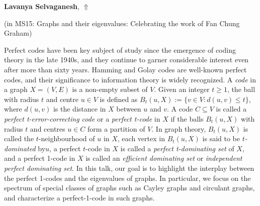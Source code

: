 \documentclass[ILAS2025-program.tex]{subfiles}
\begin{document}
\hypertarget{down0030}{}\begin{ilasabstract}
    
\textbf{Lavanya Selvaganesh},  \hfill \hyperlink{up0030}{$\Uparrow$}
    
    
(in {\color{mstitle}MS15: Graphs and their eigenvalues: Celebrating the work of Fan Chung Graham})
        
\mtskip
    Perfect codes have been key subject of study since the emergence of coding theory in the late 1940s, and they continue to garner considerable interest even after more than sixty years. Hamming and Golay codes are well-known perfect codes, and their significance to information theory is widely recognized. A \textit{code} in a graph $X=(V,E)$ is a non-empty subset of $V$. Given an integer $t\geq 1$, the ball with radius $t$ and centre $u \in V$ is defined as $B_t(u, X) := \{v \in V: d(u, v) \leq t\}$, where $d(u,v)$ is the distance in $X$ between $u$ and $v$. A code $C\subseteq V$ is called a \textit{perfect t-error-correcting code} or a \textit{perfect t-code} in $X$ if the balls $B_t(u, X)$ with radius $t$ and centres $u\in C$ form a partition of $V$. In graph theory, $B_t(u, X)$ is called the $t$-neighbourhood of $u$ in $X$, each vertex in $B_t(u, X)$ is said to be \textit{$t$-dominated} by$u$, a perfect $t$-code in $X$ is called a \textit{perfect t-dominating set} of $X$, and a perfect 1-code in $X$ is called an \textit{efficient dominating set} or \textit{independent perfect dominating set}. In this talk, our goal is to highlight the interplay between the perfect 1-codes and the eigenvalues of graphs. In particular, we focus on the spectrum of special classes of graphs such as Cayley graphs and circulant graphs, and characterize a perfect-1-code in such graphs.  


\end{ilasabstract}
    
\end{document}
